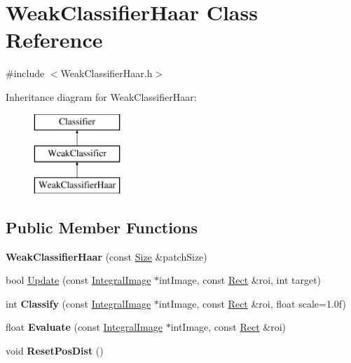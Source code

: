 \hypertarget{classWeakClassifierHaar}{}\section{Weak\+Classifier\+Haar Class Reference}
\label{classWeakClassifierHaar}


{\ttfamily \#include $<$Weak\+Classifier\+Haar.\+h$>$}

Inheritance diagram for Weak\+Classifier\+Haar\+:\begin{figure}[H]
\begin{center}
\leavevmode
\includegraphics[height=3.000000cm]{classWeakClassifierHaar}
\end{center}
\end{figure}
\subsection*{Public Member Functions}
\begin{DoxyCompactItemize}
\item 
\hypertarget{classWeakClassifierHaar_a5897c0e554cb8e3dd0cb001bb76a3c93}{}{\bfseries Weak\+Classifier\+Haar} (const \hyperlink{classSize}{Size} \&patch\+Size)\label{classWeakClassifierHaar_a5897c0e554cb8e3dd0cb001bb76a3c93}

\item 
bool \hyperlink{classWeakClassifierHaar_aa8dc6734dc435c246d9605aceea2c9a7}{Update} (const \hyperlink{classIntegralImage}{Integral\+Image} $\ast$int\+Image, const \hyperlink{classRect}{Rect} \&roi, int target)
\item 
\hypertarget{classWeakClassifierHaar_a2b7ad8b6691f6739ebe75c5301fa252b}{}int {\bfseries Classify} (const \hyperlink{classIntegralImage}{Integral\+Image} $\ast$int\+Image, const \hyperlink{classRect}{Rect} \&roi, float scale=1.\+0f)\label{classWeakClassifierHaar_a2b7ad8b6691f6739ebe75c5301fa252b}

\item 
\hypertarget{classWeakClassifierHaar_a5880dbf4a75a29e61e32903faef1dae6}{}float {\bfseries Evaluate} (const \hyperlink{classIntegralImage}{Integral\+Image} $\ast$int\+Image, const \hyperlink{classRect}{Rect} \&roi)\label{classWeakClassifierHaar_a5880dbf4a75a29e61e32903faef1dae6}

\item 
\hypertarget{classWeakClassifierHaar_ac577e6b2c75eb48bc93068966c522f3f}{}void {\bfseries Reset\+Pos\+Dist} ()\label{classWeakClassifierHaar_ac577e6b2c75eb48bc93068966c522f3f}

\end{DoxyCompactItemize}


